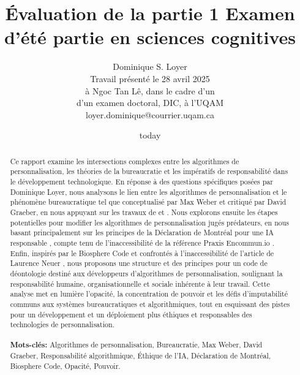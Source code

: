 \documentclass[11pt,a4paper]{article}
\title{Évaluation de la partie 1 Examen d'été partie en sciences cognitives} %
\author{Dominique S. Loyer\\
  Travail présenté le 28 avril 2025 \\
  à Ngoc Tan Lê, dans le cadre d'un \\
  d'un examen doctoral, DIC, à l'UQAM \\
  loyer.dominique@courrier.uqam.ca \\}
\date{today}
\begin{document}
\maketitle


\begin{abstract}
Ce rapport examine les intersections complexes entre les algorithmes de personnalisation, les théories de la bureaucratie et les impératifs de responsabilité dans le développement technologique. En réponse à des questions spécifiques posées par Dominique Loyer, nous analysons le lien entre les algorithmes de personnalisation et le phénomène bureaucratique tel que conceptualisé par Max Weber et critiqué par David Graeber, en nous appuyant sur les travaux de \cite{SerpaFerreira2019} et \cite{Graeber2015}. Nous explorons ensuite les étapes potentielles pour modifier les algorithmes de personnalisation jugés prédateurs, en nous basant principalement sur les principes de la Déclaration de Montréal pour une IA responsable \cite{DeclarationMontreal2018}, compte tenu de l'inaccessibilité de la référence Praxis Encommun.io \cite{PraxisInaccessible}. Enfin, inspirés par le Biosphere Code \cite{BiosphereCode2015} et confrontés à l'inaccessibilité de l'article de Laurence Neuer \cite{Neuer2018Inaccessible}, nous proposons une structure et des principes pour un code de déontologie destiné aux développeurs d'algorithmes de personnalisation, soulignant la responsabilité humaine, organisationnelle et sociale inhérente à leur travail. Cette analyse met en lumière l'opacité, la concentration de pouvoir et les défis d'imputabilité communs aux systèmes bureaucratiques et algorithmiques, tout en esquissant des pistes pour un développement et un déploiement plus éthiques et responsables des technologies de personnalisation. \\ \\
\textbf{Mots-clés:} Algorithmes de personnalisation, Bureaucratie, Max Weber, David Graeber, Responsabilité algorithmique, Éthique de l'IA, Déclaration de Montréal, Biosphere Code, Opacité, Pouvoir. \\ \\

\end{abstract}
\end{document}
